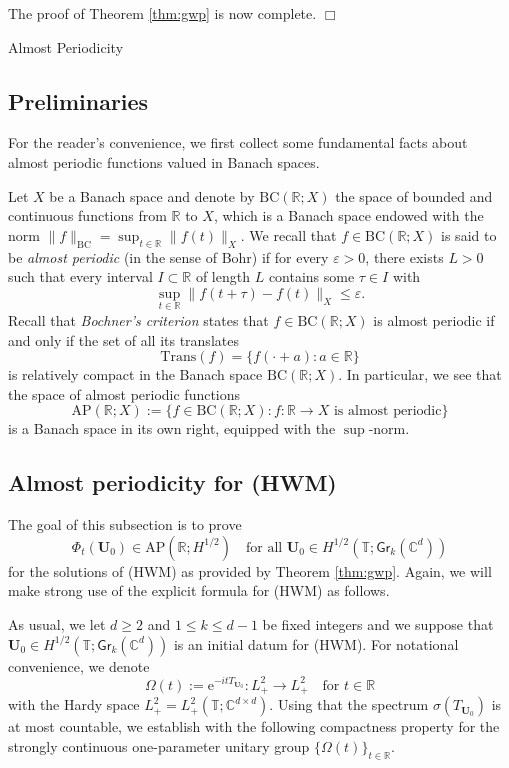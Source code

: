 \documentclass[10pt,reqno,a4paper]{amsart}
\makeatletter
\theoremstyle{definition}
\theoremstyle{remark}
\theoremstyle{remark}
\numberwithin{equation}{section}
\newcommand{\AP}{\mathrm{AP}}
\newcommand{\BC}{\mathrm{BC}}
\newcommand{\C}{\mathbb{C}}
\newcommand{\R}{\mathbb{R}}
\newcommand{\T}{\mathbb{T}}
\newcommand{\eps}{\varepsilon}
\newcommand{\eu}{\mathrm{e}}
\newcommand{\Ub}{\mathbf{U}}
\newcommand{\Gr}{\mathsf{Gr}}
\newcommand{\Om}{\Omega}
\def\section{\@startsection{section}{1}%
  \z@{1.5\linespacing\@plus\linespacing}{.5\linespacing}%
  {\normalfont\bfseries\large\centering}}
\makeatother
\begin{document}
The proof of Theorem \ref{thm:gwp} is now complete. \hfill $\Box$

\section{Almost Periodicity}

\label{sec:ap}

\subsection{Preliminaries} 
For the reader's convenience, we first collect some fundamental facts about almost periodic functions valued in Banach spaces. 

Let $X$ be a Banach space and denote by $\BC(\R; X)$ the space of bounded and continuous functions from $\R$ to $X$, which is a Banach space endowed with the norm 
$\| f \|_\BC = \sup_{t \in \R} \| f(t) \|_X$. We recall that $f \in \BC(\R;X)$ is said to be {\em almost periodic} (in the sense of Bohr) if for every $\eps > 0$, there exists $L > 0$ such that every interval $I \subset \R$ of length $L$ contains some $\tau \in I$ with
$$
\sup_{t \in \R} \| f(t + \tau) - f(t) \|_X \leq \eps.
$$
Recall that {\em Bochner's criterion} states that $f \in \BC(\R;X)$ is almost periodic if and only if the set of all its translates 
$$
\mathrm{Trans}(f) = \{ f(\cdot + a) : a \in \R \}
$$
is relatively compact in the Banach space $\BC(\R;X)$. In particular, we see that the space of almost periodic functions
$$
\AP(\R;X) := \{ f \in \BC(\R;X) : \mbox{$f : \R \to X$ is almost periodic} \}
$$
is a Banach space in its own right, equipped with the $\sup$-norm.



\subsection{Almost periodicity for (HWM)}
The goal of this subsection is to prove 
$$
\Phi_t(\Ub_0) \in \AP(\R; H^{1/2}) \quad \mbox{for all $\Ub_0 \in H^{1/2}(\T; \Gr_k(\C^d))$}
$$
for the solutions of (HWM) as provided by Theorem \ref{thm:gwp}. Again, we will make strong use of the explicit formula for (HWM) as follows.

As usual, we let $d \geq 2$ and $1 \leq k \leq d-1$ be fixed integers and we suppose that $\Ub_0 \in H^{1/2}(\T; \Gr_k(\C^d))$ is an initial datum for (HWM). For notational convenience, we denote
$$
\Omega(t) := \eu^{-i t T_{\Ub_0}} : L^2_+ \to L^2_+ \quad \mbox{for $t \in \R$}
$$
with the Hardy space $L^2_+ = L^2_+(\T;\C^{d \times d})$. Using that the spectrum $\sigma(T_{\Ub_0})$ is at most countable, we establish with the following compactness property for the strongly continuous one-parameter unitary group $\{ \Om(t) \}_{t \in \R}$.
\end{document}
